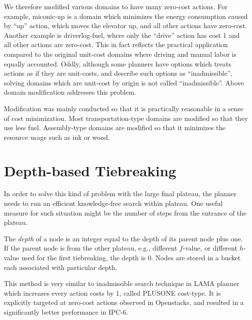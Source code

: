We therefore modified various domains to have many zero-cost actions.
For example, miconic-up is a domain which minimizes the energy
consumption caused by ``up'' action, which moves the elevator up, and
all other actions have zero-cost. Another example is driverlog-fuel, where only
the ``drive'' action has cost 1 and all other actions are zero-cost.
This in fact reflects the practical application compared to the original
unit-cost domains where driving and manual labor is equally accounted.
Oddly, although some planners have options which treats actions as if
they are unit-costs, and describe such options as ``inadmissible'',
solving domains which are unit-cost by origin is not called
``inadmissible''. Above domain modification addresses this problem.

Modification was mainly conducted so that it is practically reasonable
in a sense of cost minimization. Most transportation-type domains are
modified so that they use less fuel. Assembly-type domains are modified
so that it minimizes the resource usage such as ink or wood.

\section{Depth-based Tiebreaking}

In order to solve this kind of problem with the large final plateau, the
planner needs to run an efficient knowledge-free search within plateau.
One useful measure for such situation might be the number of steps from
the entrance of the plateau.

The \emph{depth} of a node is an integer equal to the depth of its
parent node plus one. If the parent node is from the other plateau,
e.g., different $f$-value, or different $h$-value used for the first
tiebreaking, the depth is 0. Nodes are stored in a bucket each associated with
particular depth.

This method is very similar to inadmissible search technique in LAMA
planner \cite{richter2010lama} which increases every action costs by 1,
called PLUSONE cost-type.
It is explicitly targeted at zero-cost actions observed in Openstacks, and resulted in a
significantly better performance in IPC-6.

